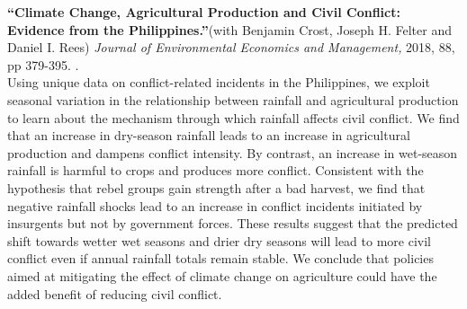 \documentclass[10pt, oneside]{article}
\begin{document}
\begin{minipage}[t]{0.8\linewidth}
\textbf{``Climate Change, Agricultural Production and Civil Conflict: Evidence from the Philippines.''}(with Benjamin Crost, Joseph H. Felter and Daniel I. Rees) \emph{Journal of Environmental Economics and Management,} 2018, 88, pp 379-395. \href{http://claireduq.github.io/Climatephilippines.pdf}{\color{blue}{Available here}}. \\
Using unique data on conflict-related incidents in the Philippines, we exploit seasonal variation in the relationship between rainfall and agricultural production to learn about the mechanism through which rainfall affects civil conflict. We find that an increase in dry-season rainfall leads to an increase in agricultural production and dampens conflict intensity. By contrast, an increase in wet-season rainfall is harmful to crops and produces more conflict. Consistent with the hypothesis that rebel groups gain strength after a bad harvest, we find that negative rainfall shocks lead to an increase in conflict incidents initiated by insurgents but not by government forces. These results suggest that the predicted shift towards wetter wet seasons and drier dry seasons will lead to more civil conflict even if annual rainfall totals remain stable. We conclude that policies aimed at mitigating the effect of climate change on agriculture could have the added benefit of reducing civil conflict.\\~\\
\end{minipage}
\end{document}
